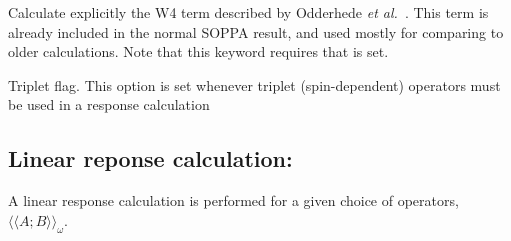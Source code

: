 \begin{description}
\item{}
Calculate explicitly the W4 term described by Odderhede {\it et
al.\/}~\cite{jopjdlycpr2}. This term is already included in the normal
SOPPA result, and used mostly for comparing to older
calculations. Note that this keyword requires that  is set.

\item{}
Triplet flag. This option is set whenever triplet
(spin-dependent)
operators must be used in a response calculation
\cite{jodlypjjcp91,ovhapjhjajthjojcp97}
\end{description}

\subsection{Linear reponse calculation: }

A linear response
\cite{jodlypjjcp91,pjhjajjojcp89} calculation is performed for a given
choice of operators, $\langle\!\langle A; B
\rangle\!\rangle_{\omega}$.

